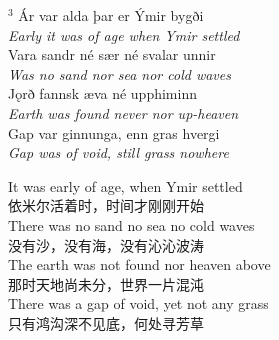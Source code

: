 \begin{paracol}{2}
    \noindent
    $^3 $ Ár var alda þar er Ýmir bygði\\
    \textit{Early it was of age when Ymir settled}\\
    Vara sandr né sær né svalar unnir\\
    \textit{Was no sand nor sea nor cold waves}\\
    Jǫrð fannsk æva né upphiminn\\
    \textit{Earth was found never nor up-heaven}\\
    Gap var ginnunga, enn gras hvergi\\
    \textit{Gap was of void, still grass nowhere}\\
    \switchcolumn

    \noindent
    It was early of age, when Ymir settled\\
    依米尔活着时，时间才刚刚开始\\
    There was no sand no sea no cold waves\\
    没有沙，没有海，没有沁沁波涛\\
    The earth was not found nor heaven above\\
    那时天地尚未分，世界一片混沌\\
    There was a gap of void, yet not any grass \\
    只有鸿沟深不见底，何处寻芳草\\

\end{paracol}

